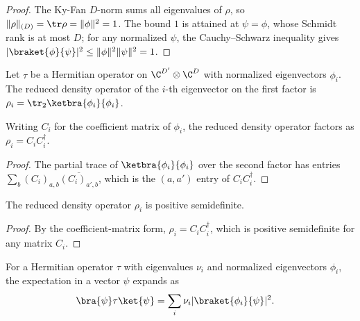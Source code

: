 \begin{proof}
    \leanok
    The Ky-Fan $D$-norm sums all eigenvalues of $\rho$, so
    $\|\rho\|_{(D)}=\tr\rho=\|\phi\|^2=1$. The bound $1$ is attained at
    $\psi=\phi$, whose Schmidt rank is at most $D$; for any normalized
    $\psi$, the Cauchy--Schwarz inequality gives
    $|\braket{\phi}{\psi}|^2\le\|\phi\|^2\|\psi\|^2=1$.
\end{proof}

\begin{definition}
    \label{def:reduced_eig_density}
    \leanok
    Let $\tau$ be a Hermitian operator on
    $\C^{D'}\otimes\C^{D}$ with normalized eigenvectors $\phi_i$. The reduced
    density operator of the $i$-th eigenvector on the first factor is
    $\rho_i=\tr_2\ketbra{\phi_i}{\phi_i}$.
\end{definition}

\begin{lemma}
    \label{lem:reduced_eig_density_factored}
    \leanok
    Writing $C_i$ for the coefficient matrix of $\phi_i$, the reduced density
    operator factors as $\rho_i=C_iC_i^\dagger$.
\end{lemma}

\begin{proof}
    \leanok
    The partial trace of $\ketbra{\phi_i}{\phi_i}$ over the second factor has
    entries $\sum_b(C_i)_{a,b}\overline{(C_i)_{a',b}}$, which is the
    $(a,a')$ entry of $C_iC_i^\dagger$.
\end{proof}

\begin{lemma}
    \label{lem:reduced_eig_density_posSemidef}
    \leanok
    The reduced density operator $\rho_i$ is positive semidefinite.
\end{lemma}

\begin{proof}
    \leanok
    By the coefficient-matrix form, $\rho_i=C_iC_i^\dagger$, which is positive
    semidefinite for any matrix $C_i$.
\end{proof}

\begin{lemma}
    \label{lem:eigenbasis_rayleigh}
    \leanok
    For a Hermitian operator $\tau$ with eigenvalues $\nu_i$ and normalized
    eigenvectors $\phi_i$, the expectation in a vector $\psi$ expands as
    \begin{align}
        \bra{\psi}\tau\ket{\psi}
         & =\sum_i\nu_i|\braket{\phi_i}{\psi}|^2.
        \label{eq:schwarz_eigenbasis_rayleigh}
    \end{align}
\end{lemma}

